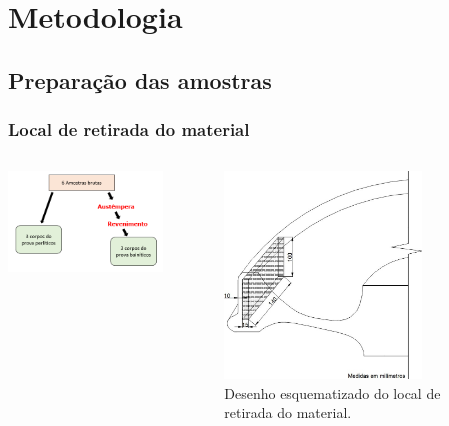 \documentclass{beamer}
\begin{document}
\section{Metodologia}
\subsection{Preparação das amostras}
\begin{frame}
\frametitle{Local de retirada do material}
\begin{columns}[c] %
	\includegraphics[width=1\textwidth]{amostrass}
	
	\begin{figure}
		\centering
		\includegraphics[width=0.8\textwidth]{secao_roda}
		\caption{Desenho esquematizado do local de retirada do material.}
		\label{fig:secao_roda}
	\end{figure}
\end{columns}
\end{frame}
\end{document}
